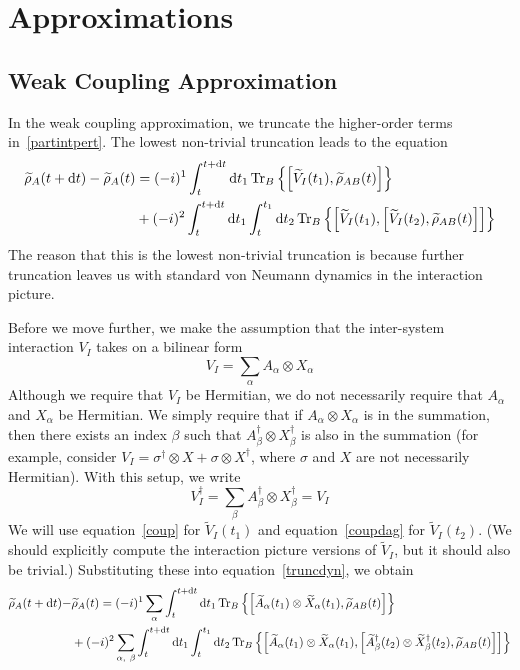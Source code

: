 \documentclass[aps, prl, preprint]{revtex4-1}
\newcommand{\ten}{\otimes}
\newcommand{\Ptra}[2]{\Tr_{#1}\left\{#2\right\}}
\newcommand{\til}[1]{\widetilde{#1}}
\begin{document}
\section{Approximations}

\subsection{Weak Coupling Approximation}

In the weak coupling approximation, we truncate the higher-order terms in~\ref{partintpert}. The lowest non-trivial truncation leads to the equation
\begin{align}\label{truncdyn}
\begin{split}
\til{\rho}_{A}(t+\dd{t}) - \til{\rho}_{A}(t) &= (-i)^1\int_t^{t+\dd{t}}\dd{t_1}\Ptra{B}{\comm{\til{V}_I(t_1)}{\til{\rho}_{AB}(t)}}\\
&+(-i)^2\int_t^{t+\dd{t}}\dd{t_1}\int_t^{t_1}\dd{t_2}\Ptra{B}{\comm{\til{V}_I(t_1)}{\comm{\til{V}_I(t_2)}{\til{\rho}_{AB}(t)}}}
\end{split}
\end{align}
The reason that this is the lowest non-trivial truncation is because further truncation leaves us with standard von Neumann dynamics in the interaction picture.

Before we move further, we make the assumption that the inter-system interaction $V_I$ takes on a bilinear form
\begin{equation}\label{coup}
V_I = \sum_{\alpha} A_{\alpha}\ten X_{\alpha}
\end{equation}
Although we require that $V_I$ be Hermitian, we do not necessarily require that $A_{\alpha}$ and $X_{\alpha}$ be Hermitian. We simply require that if $A_{\alpha}\ten X_{\alpha}$ is in the summation, then there exists an index $\beta$ such that $A_{\beta}^{\dag}\ten X_{\beta}^{\dag}$ is also in the summation (for example, consider $V_I = \sigma^{\dag}\ten X + \sigma\ten X^{\dag}$, where $\sigma$ and $X$ are not necessarily Hermitian). With this setup, we write
\begin{equation}\label{coupdag}
V_I^{\dag} = \sum_{\beta} A_{\beta}^{\dag}\ten X_{\beta}^{\dag} = V_I
\end{equation}
We will use equation~\ref{coup} for $\til{V}_I(t_1)$ and equation~\ref{coupdag} for $\til{V}_I(t_2)$. (We should explicitly compute the interaction picture versions of $\til{V}_I$, but it should also be trivial.) Substituting these into equation~\ref{truncdyn}, we obtain
\begin{align}\label{ugh}
\begin{split}
\til{\rho}_{A}(t+\dd{t}) - &\til{\rho}_{A}(t) = (-i)^1\sum_{\alpha}\int_t^{t+\dd{t}}\dd{t_1}\Ptra{B}{\comm{\til{A}_{\alpha}(t_1)\ten \til{X}_{\alpha}(t_1)}{\til{\rho}_{AB}(t)}}\\
&+(-i)^2\sum_{\alpha,\ \beta}\int_t^{t+\dd{t}}\dd{t_1}\int_t^{t_1}\dd{t_2}\Ptra{B}{\comm{\til{A}_{\alpha}(t_1)\ten \til{X}_{\alpha}(t_1)}{\comm{\til{A}_{\beta}^{\dag}(t_2)\ten \til{X}_{\beta}^{\dag}(t_2)}{\til{\rho}_{AB}(t)}}}
\end{split}
\end{align}
\end{document}
